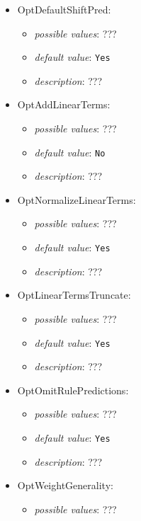 \documentclass{article}
\begin{document}
\begin{itemize}
    \item OptDefaultShiftPred:
           \begin{itemize}
                \item \emph{possible values}: ???
                \item \emph{default value}: \texttt{Yes}
                \item \emph{description}: ???
           \end{itemize}
    \item OptAddLinearTerms:
           \begin{itemize}
                \item \emph{possible values}: ???
                \item \emph{default value}: \texttt{No}
                \item \emph{description}: ???
           \end{itemize}
    \item OptNormalizeLinearTerms:
           \begin{itemize}
                \item \emph{possible values}: ???
                \item \emph{default value}: \texttt{Yes}
                \item \emph{description}: ???
           \end{itemize}
    \item OptLinearTermsTruncate:
           \begin{itemize}
                \item \emph{possible values}: ???
                \item \emph{default value}: \texttt{Yes}
                \item \emph{description}: ???
           \end{itemize}
    \item OptOmitRulePredictions:
           \begin{itemize}
                \item \emph{possible values}: ???
                \item \emph{default value}: \texttt{Yes}
                \item \emph{description}: ???
           \end{itemize}
    \item OptWeightGenerality:
           \begin{itemize}
                \item \emph{possible values}: ???

\end{itemize}
\end{itemize}
\end{document}
